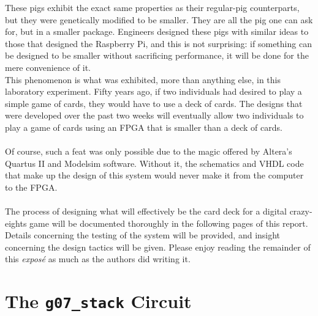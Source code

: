 \documentclass[12pt]{report}
\begin{document}
These pigs exhibit the exact same properties as their regular-pig counterparts, but they were
genetically modified to be smaller. They are all the pig one can ask for, but in a smaller
package. Engineers designed these pigs with similar ideas to those that designed the Raspberry Pi,
and this is not surprising: if something can be designed to be smaller without sacrificing
performance, it will be done for the mere convenience of it.\\
This phenomenon is what was exhibited, more than anything else, in this laboratory experiment. Fifty
years ago, if two individuals had desired to play a simple game of cards, they would have to use a deck
of cards. The designs that were developed over the past two weeks will eventually allow two individuals
to play a game of cards using an FPGA that is smaller than a deck of cards.\\\\
Of course, such a feat was only possible due to the magic offered by Altera's Quartus II and
Modelsim software. Without it, the schematics and VHDL code that make up the design of this system
would never make it from the computer to the FPGA.\\\\
The process of designing what will effectively be the card deck for a digital crazy-eights game will
be documented thoroughly in the following pages of this report. Details concerning the testing of
the system will be provided, and insight concerning the design tactics will be given. Please enjoy
reading the remainder of this \textit{exposé} as much as the authors did writing it.

\part{The \texttt{g07\_stack} Circuit}
\end{document}
